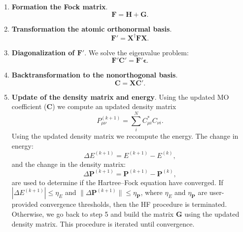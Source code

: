 \documentclass[../Main/chem532-notes.tex]{subfiles}
\begin{document}
\begin{enumerate}
\item \textbf{Formation the Fock matrix}.
\begin{equation}
\mathbf{F} = \mathbf{H} + \mathbf{G}.
\end{equation}

\item \textbf{Transformation the atomic orthonormal basis}.
\begin{equation}
\mathbf{F}' = \mathbf{X}^\dagger\mathbf{FX}.
\end{equation}

\item \textbf{Diagonalization of $\mathbf{F}'$}. We solve the eigenvalue problem:
\begin{equation}
\mathbf{F}' \mathbf{C}' = \mathbf{F}' \boldsymbol{\epsilon}.
\end{equation}

\item \textbf{Backtransformation to the nonorthogonal basis}. 
\begin{equation}
\mathbf{C} = \mathbf{X}\mathbf{C}'.
\end{equation}

\item \textbf{Update of the density matrix and energy}. 
Using the updated MO coefficient ($\mathbf{C}$) we compute an updated density matrix
\begin{equation}
P^{(k+1)}_{\mu\nu} = \sum_i^N C_{\mu i}^* C_{\nu i}.
\end{equation}
Using the updated density matrix we recompute the energy.
The change in energy:
\begin{equation}
\Delta E^{(k+1)} = E^{(k+1)} - E^{(k)},
\end{equation}
and the change in the density matrix:
\begin{equation}
\Delta \mathbf{P}^{(k+1)} = \mathbf{P}^{(k+1)} - \mathbf{P}^{(k)},
\end{equation}
are used to determine if the Hartree--Fock equation have converged.
If $|\Delta E^{(k+1)}| \leq \eta_{E}$ and $\|\Delta \mathbf{P}^{(k+1)}\| \leq \eta_{\mathbf{P}}$, where $\eta_{E}$ and $\eta_{\mathbf{P}}$ are user-provided convergence thresholds, then the HF procedure is terminated.
Otherwise, we go back to step 5 and build the matrix $\mathbf{G}$ using the updated density matrix. This procedure is iterated until convergence.
\end{enumerate}
\end{document}
